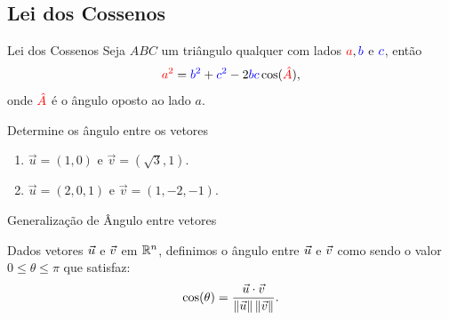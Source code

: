 \subsection*{Lei dos Cossenos}
\begin{frame}[label=vetores2]


	\begin{exampleblock}{Lei dos Cossenos}
	Seja $ABC$ um triângulo qualquer com lados ${\color{red}a}, {\color{blue}b}$ e ${\color{blue}c}$, então
	\[{\color{red}a^2}={\color{blue}b^2}+{\color{blue}c^2}-2{\color{blue}b c}\cos( {\color{red}\hat{A}}),\]
	onde ${\color{red}\hat{A}}$ é o ângulo oposto ao lado $a$. 
	
	\begin{center}
	\end{center}
\end{exampleblock}
\end{frame}



\begin{frame}[label=vetores2]
\begin{exe}
Determine os ângulo entre os vetores
\begin{enumerate}
\item $\vec{u}=(1,0)$ e $\vec{v}=(\sqrt{3},1)$.

\item $\vec{u}=(2,0,1)$ e $\vec{v}=(1,-2,-1)$.
\end{enumerate}
\end{exe}

\end{frame}
\begin{frame}[label=vetores2]{Generalização de Ângulo entre vetores}

\begin{defin}
Dados vetores $\vec{u}$ e $\vec{v}$ em $\mathbb{R}^n$, definimos o {\color{blue}ângulo entre $\vec{u}$ e $\vec{v}$} como sendo o valor $0\leq \theta\leq \pi$ que satisfaz:
\[\cos(\theta)=\frac{\vec{u}\cdot\vec{v}}{\|\vec{u}\|\, \|\vec{v}\|}. \] 
\end{defin}

\end{frame}

